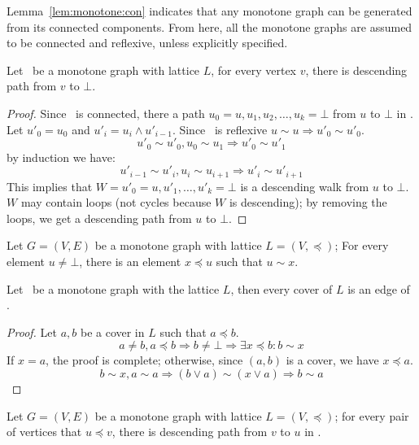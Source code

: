 Lemma~\ref{lem:monotone:con} indicates that any monotone graph can be generated
from its connected components. From here, all the monotone graphs are
assumed to be connected and reflexive, unless explicitly specified.

\begin{lemma}
Let \mG\ be a monotone graph with lattice  \(L\),
for every vertex \(v\), there is descending path from
\(v\) to \(\bot\)\@.
\end{lemma}

\begin{proof}
Since \mG\ is connected, there a path \(u_0=u,u_1,u_2,\dotsc,u_k=\bot\) from \(u\) to 
\(\bot\) in \mG\@. Let \(u'_0=u_0\) and \(u'_i = u_i\wedge u'_{i-1}\)\@.
Since \mG\ is reflexive \(u\sim u \Rightarrow u'_0\sim u'_0\)\@.
\[u'_0\sim u'_0, u_0\sim u_1 \Rightarrow u'_0\sim u'_1\]
by induction we have:
\[u'_{i-1}\sim u'_i, u_i\sim u_{i+1} \Rightarrow u'_i\sim u'_{i+1} \]
This implies that \(W=u'_0=u,u'_1,\dotsc,u'_k=\bot\) is a descending walk from 
\(u\) to \(\bot\)\@. \(W\) may contain loops (not cycles because \(W\) is descending);
by removing the loops, we get a descending path from \(u\) to \(\bot\)\@.
\end{proof}

\begin{cor}
Let \(G=(V,E)\) be a monotone graph with lattice \(L=(V,\preceq)\); 
For every element \(u \neq \bot\),
there is an element \(x \preceq u\) such that \(u\sim x\)\@.
\end{cor}

\begin{lemma}
Let \mG\ be a monotone graph with the lattice \(L\), then every cover
of \(L\) is an edge of \mG\@.
\end{lemma}

\begin{proof}
Let \(a,b\) be a cover in \(L\) such that \(a \preceq b\)\@.
\[a \neq b, a \preceq b \Rightarrow b\neq \bot \Rightarrow \exists x \preceq b: b\sim x\]
If \(x=a\), the proof is complete; otherwise, since \((a,b)\) is a cover, we have \(x\preceq a\).
\[b\sim x,a\sim a \Rightarrow (b \vee a) \sim (x \vee a) \Rightarrow b\sim a\]\@
\end{proof}

\begin{cor}
Let \(G=(V,E)\) be a monotone graph with lattice \(L=(V, \preceq)\);
for every pair of vertices that \(u\preceq v\), there is descending path from
\(v\) to \(u\) in \mG\@. 
\end{cor}

